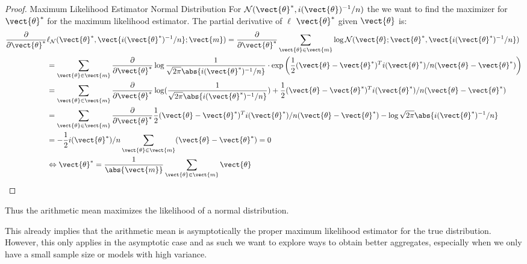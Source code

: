 \begin{proof}{Maximum Likelihood Estimator Normal Distribution}
    For $\mathcal{N}(\vect{\theta}^*, i(\vect{\theta})^{-1}/n)$ the we want to find the maximizer for $\vect{\theta}^*$ for the maximum likelihood estimator. 
    The partial derivative of $\ell$ \wrt $\vect{\theta}^*$ given $\vect{\theta}$ is:
    \begin{equation}
        \begin{split}
        \frac{\partial}{\partial \vect{\theta}^*}&\ell_{\mathcal{N}}(\vect{\theta}^*, \vect{i(\vect{\theta}^*)^{-1}/n}; \vect{m}) =  \frac{\partial}{\partial \vect{\theta}^*} \sum_{\vect{\theta} \in \vect{m}} \log \mathcal{N}(\vect{\theta}; \vect{\theta}^*, \vect{i(\vect{\theta}^*)^{-1}/n})\\
        &=  \sum_{\vect{\theta} \in \vect{m}} \frac{\partial}{\partial \vect{\theta}^*} \log \frac{1}{\sqrt{2 \pi} \abs{i(\vect{\theta}^*)^{-1}/n}} \cdot \exp\bigg(\frac{1}{2} (\vect{\theta} - \vect{\theta}^*)^Ti(\vect{\theta}^*)/n(\vect{\theta} - \vect{\theta}^*) \bigg) \\
        &=  \sum_{\vect{\theta} \in \vect{m}} \frac{\partial}{\partial \vect{\theta}^*} \log (\frac{1}{\sqrt{2 \pi} \abs{i(\vect{\theta}^*)^{-1}/n}}) + \frac{1}{2} (\vect{\theta} - \vect{\theta}^*)^Ti(\vect{\theta}^*)/n(\vect{\theta} - \vect{\theta}^*) \\
        &=  \sum_{\vect{\theta} \in \vect{m}} \frac{\partial}{\partial \vect{\theta}^*} \frac{1}{2} (\vect{\theta} - \vect{\theta}^*)^Ti(\vect{\theta}^*)/n(\vect{\theta} - \vect{\theta}^*) - \log \sqrt{2 \pi} \abs{i(\vect{\theta}^*)^{-1}/n} \\
        &= - \frac{1}{2} i(\vect{\theta}^*)/n \sum_{\vect{\theta} \in \vect{m}} (\vect{\theta} - \vect{\theta}^*) = 0 \\
        &\Leftrightarrow \vect{\theta}^* = \frac{1}{\abs{\vect{m}}} \sum_{\vect{\theta} \in \vect{m}}  \vect{\theta}
        \end{split}
    \end{equation}
\end{proof}
Thus the arithmetic mean maximizes the likelihood of a normal distribution.

This already implies that the arithmetic mean is asymptotically the proper maximum likelihood estimator for the true distribution. 
However, this only applies in the asymptotic case and as such we want to explore ways to obtain better aggregates, especially when we only have a small sample size or models with high variance.

